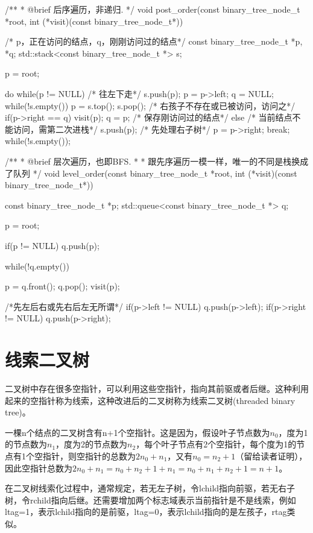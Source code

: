 \begin{Codex}[label=binary_tree.cpp]
/**
 * @brief 后序遍历，非递归.
 */
void post_order(const binary_tree_node_t *root,
                int (*visit)(const binary_tree_node_t*)) {
    /* p，正在访问的结点，q，刚刚访问过的结点*/
    const binary_tree_node_t *p, *q;
    std::stack<const binary_tree_node_t *> s;

    p = root;

    do {
        while(p != NULL) { /* 往左下走*/
            s.push(p);
            p = p->left;
        }
        q = NULL;
        while(!s.empty()) {
            p = s.top();
            s.pop();
            /* 右孩子不存在或已被访问，访问之*/
            if(p->right == q) {
                visit(p);
                q = p; /* 保存刚访问过的结点*/
            } else {
                /* 当前结点不能访问，需第二次进栈*/
                s.push(p);
                /* 先处理右子树*/
                p = p->right;
                break;
            }
        }
    } while(!s.empty());
}

/**
 * @brief 层次遍历，也即BFS.
 *
 * 跟先序遍历一模一样，唯一的不同是栈换成了队列
 */
void level_order(const binary_tree_node_t *root,
                int (*visit)(const binary_tree_node_t*)) {
    const binary_tree_node_t *p;
    std::queue<const binary_tree_node_t *> q;

    p = root;

    if(p != NULL) q.push(p);

    while(!q.empty()) {
        p = q.front();
        q.pop();
        visit(p);

        /*先左后右或先右后左无所谓*/
        if(p->left != NULL) q.push(p->left);
        if(p->right != NULL) q.push(p->right);
    }
}
\end{Codex}

\section{线索二叉树} %
二叉树中存在很多空指针，可以利用这些空指针，指向其前驱或者后继。这种利用起来的空指针称为线索，这种改进后的二叉树称为线索二叉树(threaded binary tree)。

一棵n个结点的二叉树含有n+1个空指针。这是因为，假设叶子节点数为$n_0$，度为1的节点数为$n_1$，度为2的节点数为$n_2$，每个叶子节点有2个空指针，每个度为1的节点有1个空指针，则空指针的总数为$2n_0+n_1$，又有$n_0=n_2+1$（留给读者证明），因此空指针总数为$2n_0+n_1=n_0+n_2+1+n_1=n_0+n_1+n_2+1=n+1$。

在二叉树线索化过程中，通常规定，若无左子树，令lchild指向前驱，若无右子树，令rchild指向后继。还需要增加两个标志域表示当前指针是不是线索，例如ltag=1，表示lchild指向的是前驱，ltag=0，表示lchild指向的是左孩子，rtag类似。

